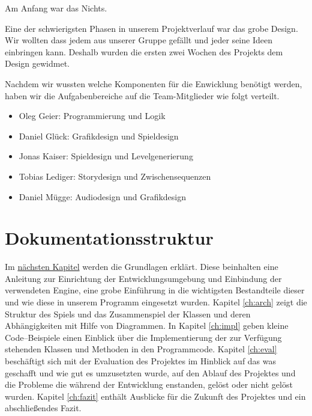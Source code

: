 Am Anfang war das Nichts.

Eine der schwierigsten Phasen in unserem Projektverlauf war das grobe Design. Wir wollten dass  \gamename jedem aus unserer Gruppe gefällt und jeder seine Ideen einbringen kann. Deshalb wurden die ersten zwei Wochen des Projekts dem Design gewidmet. 

Nachdem wir wussten welche Komponenten für die Enwicklung benötigt werden, haben wir die Aufgabenbereiche auf die Team-Mitglieder wie folgt verteilt.

\begin{itemize}

\item Oleg Geier: Programmierung und Logik

\item Daniel Glück: Grafikdesign und Spieldesign

\item Jonas Kaiser: Spieldesign und Levelgenerierung

\item Tobias Lediger: Storydesign und Zwischensequenzen

\item Daniel Mügge: Audiodesign und Grafikdesign
	
\end{itemize}



\section{Dokumentationsstruktur}\label{sec:1_Dokumentationsstruktur}
Im \href{ch:grundl}{nächsten Kapitel} werden die Grundlagen erklärt. Diese beinhalten eine Anleitung zur Einrichtung der Entwicklungsumgebung und Einbindung der verwendeten Engine, eine grobe Einführung in die wichtigsten Bestandteile dieser und wie diese in unserem Programm eingesetzt wurden. 
Kapitel \ref{ch:arch} zeigt die Struktur des Spiels und das Zusammenspiel der Klassen und deren Abhängigkeiten mit Hilfe von Diagrammen.
In Kapitel \ref{ch:impl} geben kleine Code--Beispiele einen Einblick über die Implementierung der zur Verfügung stehenden Klassen und Methoden in den Programmcode.
Kapitel \ref{ch:eval} beschäftigt sich mit der Evaluation des Projektes im Hinblick auf das was geschafft und wie gut es umzusetzten wurde, auf den Ablauf des Projektes und die Probleme die während der Entwicklung enstanden, gelöst oder nicht gelöst wurden.
Kapitel \ref{ch:fazit} enthält Ausblicke für die Zukunft des Projektes und ein abschließendes Fazit.



